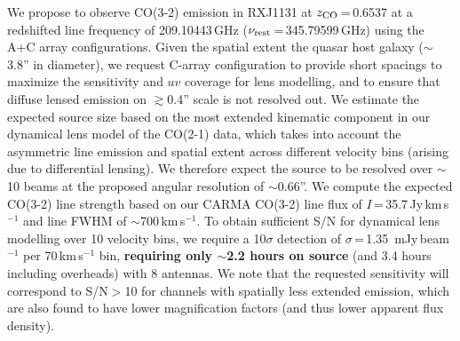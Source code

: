 \documentclass[11pt,a4paper,twoside,graphicx,color]{article}
\newcommand{\bco}{\mbox{CO(2-1)}\xspace}
\newcommand{\cco}{\mbox{CO(3-2)}\xspace}
\newcommand{\kms}{km\,s$^{-1}$\xspace}
\newcommand{\pmOne}{\mbox{$^{-1}$}\xspace}
\newcommand{\eq}{\,=\,}
\begin{document}
\vspace{.2em}
We propose to observe \cco emission in RXJ1131 at $z_{\rm CO}$\eq0.6537 at a
redshifted line frequency of 209.10443\,GHz ($\nu_{\rm rest}$\eq345.79599\,GHz) using the A+C array configurations.
Given the spatial extent the quasar host galaxy ($\sim$3.8'' in diameter),
we request C-array configuration to provide short spacings
to maximize the sensitivity and $uv$ coverage for lens modelling, and to
ensure that diffuse lensed emission on $\gtrsim$0.4'' scale is not resolved out. %
We estimate the expected source size based on the
most extended kinematic component in our dynamical lens model of the \bco data, which takes into account the asymmetric line emission and spatial extent across different velocity bins (arising due to differential lensing).
We therefore expect the source to be resolved over $\sim$10 beams at the proposed angular resolution of $\sim$0.66''.
We compute the expected \cco line strength based on our
CARMA \cco line flux of $I$\eq35.7\,Jy\,\kms and line FWHM of $\sim$700\,\kms.
To obtain sufficient S/N for dynamical lens modelling over 10 velocity bins,
we require a 10$\sigma$ detection of $\sigma$\eq1.35
\,mJy\,beam\pmOne per 70\,\kms bin,
{\bf requiring only $\sim$2.2 hours on source} (and 3.4 hours including overheads) with 8 antennas.
We note that the requested sensitivity will correspond to S/N$>$10 for channels with spatially less extended emission, which are also found to have lower magnification factors (and thus lower apparent flux density).

\clearpage
\end{document}
